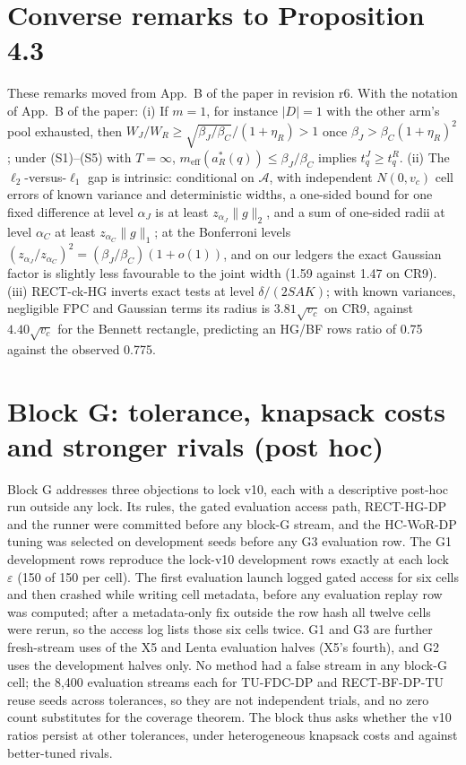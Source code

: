 \documentclass[sigconf,anonymous,review]{acmart}
\newcommand{\cA}{\mathcal{A}}
\newcommand{\eps}{\varepsilon}
\newcommand{\meff}{m_{\text{eff}}}
\begin{document}
\section{Converse remarks to Proposition 4.3}\label{app:converse}

These remarks moved from App.~B of the paper in revision r6. With the notation of App.~B of the paper: (i) If $m = 1$, for instance $|D|=1$ with the other arm's pool exhausted, then $W_J/W_R \ge \sqrt{\beta_J/\beta_C}/(1+\eta_R) > 1$ once $\beta_J > \beta_C(1+\eta_R)^2$; under (S1)--(S5) with $T = \infty$, $\meff(a_R^*(q)) \le \beta_J/\beta_C$ implies $t^J_q \ge t^R_q$. (ii) The $\ell_2$-versus-$\ell_1$ gap is intrinsic: conditional on $\cA$, with independent $N(0, v_c)$ cell errors of known variance and deterministic widths, a one-sided bound for one fixed difference at level $\alpha_J$ is at least $z_{\alpha_J}\|g\|_2$, and a sum of one-sided radii at level $\alpha_C$ at least $z_{\alpha_C}\|g\|_1$; at the Bonferroni levels $(z_{\alpha_J}/z_{\alpha_C})^2 = (\beta_J/\beta_C)(1+o(1))$, and on our ledgers the exact Gaussian factor is slightly less favourable to the joint width (1.59 against 1.47 on CR9). (iii) RECT-ck-HG inverts exact tests at level $\delta/(2SAK)$; with known variances, negligible FPC and Gaussian terms its radius is $3.81\sqrt{v_c}$ on CR9, against $4.40\sqrt{v_c}$ for the Bennett rectangle, predicting an HG/BF rows ratio of 0.75 against the observed 0.775.

\section{Block G: tolerance, knapsack costs and stronger rivals (post hoc)}\label{app:blockg}

Block G addresses three objections to lock v10, each with a descriptive post-hoc run outside any lock. Its rules, the gated evaluation access path, RECT-HG-DP and the runner were committed before any block-G stream, and the HC-WoR-DP tuning was selected on development seeds before any G3 evaluation row. The G1 development rows reproduce the lock-v10 development rows exactly at each lock $\eps$ (150 of 150 per cell). The first evaluation launch logged gated access for six cells and then crashed while writing cell metadata, before any evaluation replay row was computed; after a metadata-only fix outside the row hash all twelve cells were rerun, so the access log lists those six cells twice. G1 and G3 are further fresh-stream uses of the X5 and Lenta evaluation halves (X5's fourth), and G2 uses the development halves only. No method had a false stream in any block-G cell; the 8,400 evaluation streams each for TU-FDC-DP and RECT-BF-DP-TU reuse seeds across tolerances, so they are not independent trials, and no zero count substitutes for the coverage theorem. The block thus asks whether the v10 ratios persist at other tolerances, under heterogeneous knapsack costs and against better-tuned rivals.
\end{document}
